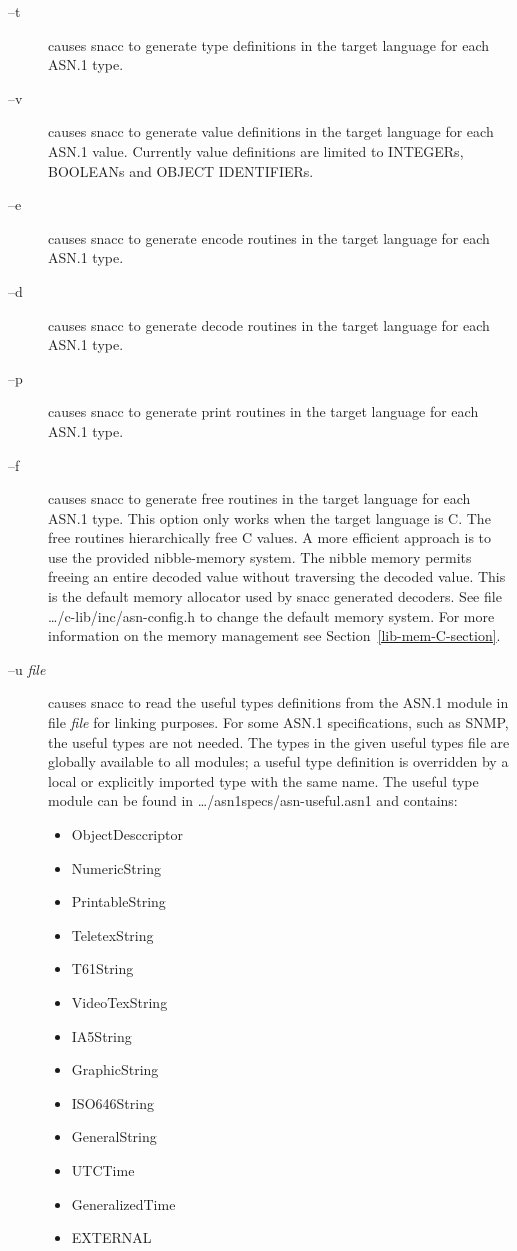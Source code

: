 \begin{description}
\item[--t    ]
  causes snacc to generate type definitions in the target language for each ASN.1 type.

\item[--v    ]
  causes snacc to generate value definitions in the target language for each ASN.1 value.
  Currently value definitions are limited to INTEGERs, BOOLEANs and OBJECT IDENTIFIERs.

\item[--e    ]
  causes snacc to generate encode routines in the target language for each ASN.1 type.

\item[--d    ]
  causes snacc to generate decode routines in the target language for each ASN.1 type.

\item[--p    ]
  causes snacc to generate print routines in the target language for each ASN.1 type.

\item[--f    ]
  causes snacc to generate free routines in the target language for each ASN.1 type.
  This option only works when the target language is C\@.
  The free routines hierarchically free C values.
  A more efficient approach is to use the provided nibble-memory system.
  The nibble memory permits freeing an entire decoded value without traversing the decoded value.
  This is the default memory allocator used by snacc generated decoders.
  See file {\ufn \dots/c-lib/inc/asn-config.h} to change the default memory system.
  For more information on the memory management see Section~\ref{lib-mem-C-section}.

\item[--u \emph{file}]
  causes snacc to read the useful types definitions from the ASN.1 module in file \emph{file} for linking purposes.
  For some ASN.1 specifications, such as SNMP, the useful types are not needed.
  The types in the given useful types file are globally available to all modules; a useful type definition is overridden by a local or explicitly imported type with the same name.
  The useful type module can be found in {\ufn \dots/asn1specs/asn-useful.asn1} and contains:
  \begin{itemize}
    \setlength{\itemsep}{0pt}
    \setlength{\parsep}{0pt}
    \item ObjectDesccriptor
    \item NumericString
    \item PrintableString
    \item TeletexString
    \item T61String
    \item VideoTexString
    \item IA5String
    \item GraphicString
    \item ISO646String
    \item GeneralString
    \item UTCTime
    \item GeneralizedTime
    \item EXTERNAL
  \end{itemize}


\end{description}
